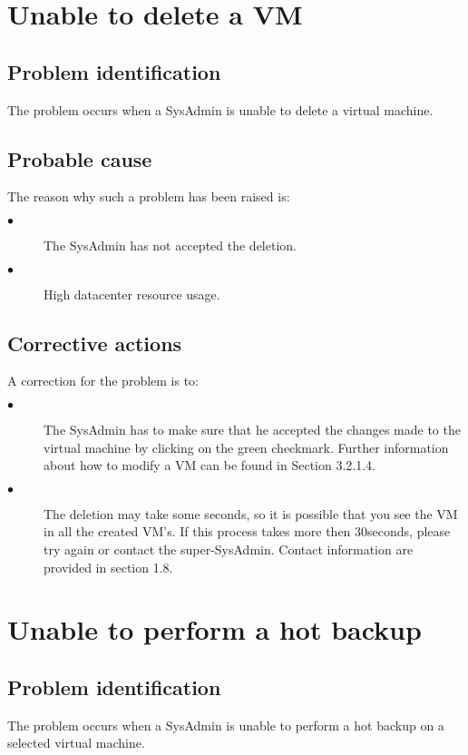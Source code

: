 \section{Unable to delete a VM}

\subsection{Problem identification}
The problem occurs when a SysAdmin is unable to delete a virtual
machine.

\subsection{Probable cause}

The reason why such a problem has been raised is:\\
\begin{description}
\item[$\bullet$] The SysAdmin has not accepted the deletion.
\item[$\bullet$] High datacenter resource usage.
\end{description}


\subsection{Corrective actions}

A correction for the problem is to:\\
\begin{description}
\item[$\bullet$] The SysAdmin has to make sure that he accepted the changes made
to the virtual machine by clicking on the green checkmark. Further information about
how to modify a VM can be found in Section 3.2.1.4.
\item[$\bullet$] The deletion may take some seconds, so it is possible that you see
the VM in all the created VM's. If this process takes more then 30seconds, please try
again or contact the super-SysAdmin. Contact information are provided in section 1.8.
\end{description}






\section{Unable to perform a hot backup}

\subsection{Problem identification}
The problem occurs when a SysAdmin is unable to perform a hot
backup on a selected virtual machine.

